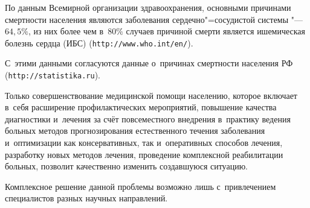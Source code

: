 


\date{02/II/2011} %









\maketitle












По данным Всемирной организации здравоохранения, основными причинами смертности населения являются заболевания сердечно"=сосудистой системы "--- $64,5\%$, из них более чем в~$80\%$ случаев причиной смерти является ишемическая болезнь сердца (ИБС) ({\small \tt http://www.who.int/en/}). 

С~этими данными согласуются данные о~причинах смертности населения РФ ({\small \tt http://statistika.ru}). 

Только совершенствование медицинской помощи населению, которое включает в~себя расширение профилактических мероприятий, повышение качества диагностики и~лечения за счёт повсеместного внедрения в~практику ведения больных методов прогнозирования естественного течения заболевания и~оптимизации как консервативных, так и~оперативных способов лечения, разработку новых методов лечения, проведение комплексной реабилитации больных, позволит качественно изменить создавшуюся ситуацию. 

Комплексное решение данной проблемы возможно лишь с~привлечением специалистов разных научных направлений. 

